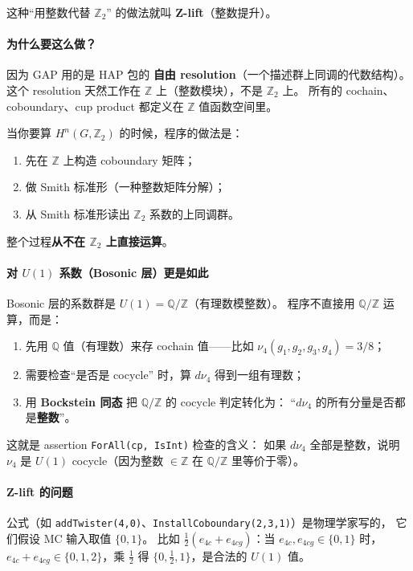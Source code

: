 \documentclass[a4paper,fontset=ubuntu,12pt]{ctexart}
\begin{document}
这种``用整数代替 $\mathbb{Z}_2$'' 的做法就叫 \textbf{Z-lift}（整数提升）。

\paragraph{为什么要这么做？}
因为 GAP 用的是 HAP 包的 \textbf{自由 resolution}（一个描述群上同调的代数结构）。
这个 resolution 天然工作在 $\mathbb{Z}$ 上（整数模块），不是 $\mathbb{Z}_2$ 上。
所有的 cochain、coboundary、cup product 都定义在 $\mathbb{Z}$ 值函数空间里。

当你要算 $H^n(G, \mathbb{Z}_2)$ 的时候，程序的做法是：
\begin{enumerate}
\item 先在 $\mathbb{Z}$ 上构造 coboundary 矩阵；
\item 做 Smith 标准形（一种整数矩阵分解）；
\item 从 Smith 标准形读出 $\mathbb{Z}_2$ 系数的上同调群。
\end{enumerate}
整个过程\textbf{从不在 $\mathbb{Z}_2$ 上直接运算}。

\paragraph{对 $U(1)$ 系数（Bosonic 层）更是如此}
Bosonic 层的系数群是 $U(1) = \mathbb{Q}/\mathbb{Z}$（有理数模整数）。
程序不直接用 $\mathbb{Q}/\mathbb{Z}$ 运算，而是：
\begin{enumerate}
\item 先用 $\mathbb{Q}$ 值（有理数）来存 cochain 值——比如 $\nu_4(g_1, g_2, g_3, g_4) = 3/8$；
\item 需要检查``是否是 cocycle'' 时，算 $d\nu_4$ 得到一组有理数；
\item 用 \textbf{Bockstein 同态} 把 $\mathbb{Q}/\mathbb{Z}$ 的 cocycle 判定转化为：
      ``$d\nu_4$ 的所有分量是否都是\textbf{整数}''。
\end{enumerate}
这就是 assertion \texttt{ForAll(cp, IsInt)} 检查的含义：
如果 $d\nu_4$ 全部是整数，说明 $\nu_4$ 是 $U(1)$ cocycle（因为整数 $\in \mathbb{Z}$ 在 $\mathbb{Q}/\mathbb{Z}$ 里等价于零）。

\paragraph{Z-lift 的问题}
公式（如 \texttt{addTwister(4,0)}、\texttt{InstallCoboundary(2,3,1)}）是物理学家写的，
它们假设 MC 输入取值 $\{0, 1\}$。
比如 $\frac{1}{2}(e_{4c} + e_{4cg})$：当 $e_{4c}, e_{4cg} \in \{0, 1\}$ 时，
$e_{4c} + e_{4cg} \in \{0, 1, 2\}$，乘 $\frac{1}{2}$ 得 $\{0, \frac{1}{2}, 1\}$，是合法的 $U(1)$ 值。
\end{document}

